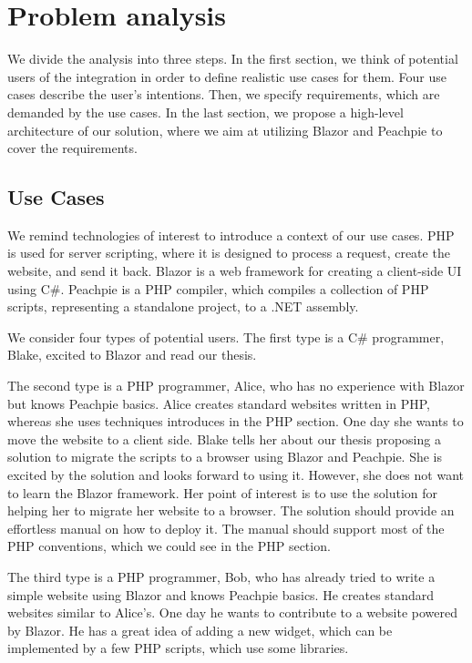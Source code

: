 \chapter{Problem analysis}
We divide the analysis into three steps.
In the first section, we think of potential users of the integration in order to define realistic use cases for them.
Four use cases describe the user's intentions.
Then, we specify requirements, which are demanded by the use cases.
In the last section, we propose a high-level architecture of our solution, where we aim at utilizing Blazor and Peachpie to cover the requirements.

\section{Use Cases}
We remind technologies of interest to introduce a context of our use cases.
PHP is used for server scripting, where it is designed to process a request, create the website, and send it back.
Blazor is a web framework for creating a client-side UI using C\#.
Peachpie is a PHP compiler, which compiles a collection of PHP scripts, representing a standalone project, to a .NET assembly.
\par
We consider four types of potential users.
The first type is a C\# programmer, Blake, excited to Blazor and read our thesis.
\par
The second type is a PHP programmer, Alice, who has no experience with Blazor but knows Peachpie basics.
Alice creates standard websites written in PHP, whereas she uses techniques introduces in the PHP section.
One day she wants to move the website to a client side.
Blake tells her about our thesis proposing a solution to migrate the scripts to a browser using Blazor and Peachpie.
She is excited by the solution and looks forward to using it.
However, she does not want to learn the Blazor framework.
Her point of interest is to use the solution for helping her to migrate her website to a browser.
The solution should provide an effortless manual on how to deploy it.
The manual should support most of the PHP conventions, which we could see in the PHP section.
\par
The third type is a PHP programmer, Bob, who has already tried to write a simple website using Blazor and knows Peachpie basics.
He creates standard websites similar to Alice's.
One day he wants to contribute to a website powered by Blazor.
He has a great idea of adding a new widget, which can be implemented by a few PHP scripts, which use some libraries.
